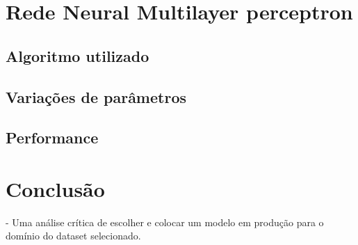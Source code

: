 \documentclass[12pt,a4paper]{article}
\begin{document}
\newpage
\section{Rede Neural Multilayer perceptron}

\subsection{Algoritmo utilizado}
\subsection{Variações de parâmetros}
\subsection{Performance}

\newpage
\section{Conclusão}

- Uma análise crítica de escolher e colocar um modelo em produção para o domínio do dataset selecionado.
\end{document}
